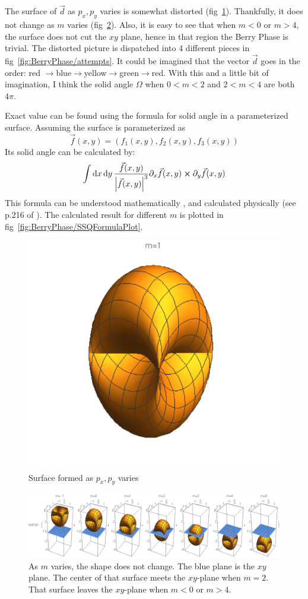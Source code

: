 \documentclass{article}
\begin{document}
    The surface of $\vec{d}$ as $p_x,p_y$ varies is somewhat distorted
    (fig~\ref{fig:BerryPhase/Shape}). Thankfully, it does not change as $m$
    varies (fig~\ref{fig:BerryPhase/AsMVaries}). Also, it is easy to see that
    when $m<0$ or $m>4$, the surface does not cut the $xy$ plane, hence in that
    region the Berry Phase is trivial. The distorted picture is dispatched into
    4 different pieces in fig~\ref{fig:BerryPhase/attempts}. It could be
    imagined that the vector $\vec{d}$ goes in the order: red
    $\to$blue$\to$yellow$\to$green$\to$red. With this and a little bit of
    imagination, I think the solid angle $\Omega$ when $0<m<2$ and $2<m<4$ are
    both $4\pi$.

    Exact value can be found using the formula for solid angle in a
    parameterized surface. Assuming the surface is parameterized as
    \begin{equation}
        \vec{f}(x,y) = (f_1(x,y), f_2(x,y), f_3(x,y))
    \end{equation}
    Its solid angle can be calculated by:
    \begin{equation}
        \int\dd{x}\dd{y} \frac{\vec{f}(x,y)}{\abs{\vec{f}(x,y)}^3}
        \partial_x \vec{f}(x,y) \cross \partial_y \vec{f}(x,y)
    \end{equation}
    This formula can be understood mathematically
    \cite{SolidAngleParameterizedSurface}, and calculated physically (see p.216 of
    \cite{Shen2012}).  The calculated result for different $m$ is plotted in
    fig~\ref{fig:BerryPhase/SSQFormulaPlot}.
    \begin{figure}[htpb]
        \centering
        \includegraphics[width=0.5\linewidth]{pics/BerryPhase/Shape.pdf}
        \caption{Surface formed as $p_x,p_y$ varies}
        \label{fig:BerryPhase/Shape}
    \end{figure}
    \begin{figure}[htpb]
        \centering
        \includegraphics[width=0.8\linewidth]{pics/BerryPhase/AsMVaries.pdf}
        \caption{As $m$ varies, the shape does not change. The blue plane is the
        $xy$ plane. The center of that surface meets the $xy$-plane when $m=2$.
        That surface leaves the $xy$-plane when $m<0$ or $m>4$.}
        \label{fig:BerryPhase/AsMVaries}
    \end{figure}
\end{document}
